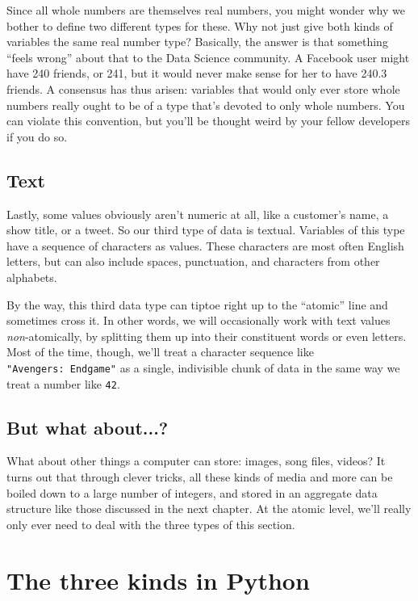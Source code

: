 Since all whole numbers are themselves real numbers, you might wonder why we
bother to define two different types for these. Why not just give both kinds of
variables the same real number type? Basically, the answer is that something
``feels wrong'' about that to the Data Science community. A Facebook user might
have 240 friends, or 241, but it would never make sense for her to have 240.3
friends. A consensus has thus arisen: variables that would only ever store
whole numbers really ought to be of a type that's devoted to only whole
numbers. You can violate this convention, but you'll be thought weird by your
fellow developers if you do so.


\subsection{Text}

Lastly, some values obviously aren't numeric at all, like a customer's name, a
show title, or a tweet. So our third type of data is textual. Variables of this
type have a sequence of characters as values. These characters are most often
English letters, but can also include spaces, punctuation, and characters from
other alphabets.

By the way, this third data type can tiptoe right up to the ``atomic'' line and
sometimes cross it. In other words, we will occasionally work with text values
\textit{non}-atomically, by splitting them up into their constituent words or
even letters. Most of the time, though, we'll treat a character sequence like
\texttt{"Avengers:\ Endgame"} as a single, indivisible chunk of data in the
same way we treat a number like \texttt{42}.

\subsection{But what about...?}

What about other things a computer can store: images, song files, videos? It
turns out that through clever tricks, all these kinds of media and more can be
boiled down to a large number of integers, and stored in an aggregate data
structure like those discussed in the next chapter. At the atomic level, we'll
really only ever need to deal with the three types of this section.

\section{The three kinds in Python}


